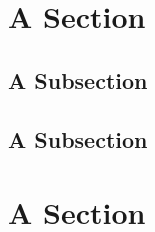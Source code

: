 \documentclass[10pt,a4paper]{scrartcl} %
\begin{document}
    \title{\rmfamily\normalfont{}}
    \author{}
    \date{} %
    
    \maketitle
    
    \begin{abstract}
        \noindent\lipsum[1]
    \end{abstract}
    
    \tableofcontents
    
    \section{A Section}
    \lipsum[1]
    \subsection{A Subsection}
    \lipsum[1]
    \subsection{A Subsection}
    
    \section{A Section}
    \lipsum[1]
    
    \nocite{*}
    
    
\end{document}
